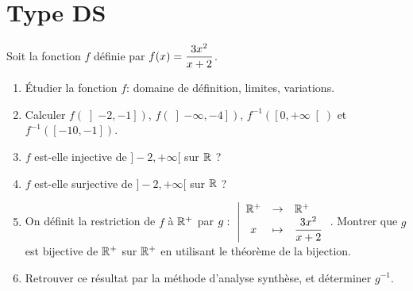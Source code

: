\documentclass[a4paper, 11pt,reqno]{article}
\begin{document}
\section*{Type DS}


\begin{exercice}
	\noindent Soit la fonction $f$ d\'efinie par $f(x)=\displaystyle\frac{3x^2}{x+2}$.
	\begin{enumerate}
		\item \'Etudier la fonction $f$: domaine de d\'efinition, limites, variations.
		\item Calculer $f\left(\left]-2,-1\right]\right)$, $f\left(\left]-\infty,-4\right]\right)$, $f^{-1}\left(\left[0,+\infty\right[\right)$ et $f^{-1}\left(\left[-10,-1\right]\right)$.
		\item $f$ est-elle injective de $\rbrack -2,+\infty\lbrack$ sur $\mathbb{R}$ ?
		\item $f$ est-elle surjective de $\rbrack -2,+\infty\lbrack$ sur $\mathbb{R}$ ?
		\item On d\'efinit la restriction de $f$ \`a $\mathbb{R}^+$ par $g:\ \left| \begin{array}{ccl}
				      \mathbb{R}^+ & \rightarrow & \mathbb{R}^+                 \\
				      x    & \mapsto     & \displaystyle\frac{3x^2}{x+2} \\
			      \end{array} \right.$.
		      Montrer que $g$ est bijective de $\mathbb{R}^+$ sur $\mathbb{R}^+$ en utilisant le th\'eor\`eme de la bijection.
		\item Retrouver ce r\'esultat par la m\'ethode d'analyse synth\`ese, et d\'eterminer $g^{-1}$.
	\end{enumerate}
\end{exercice}
\end{document}
